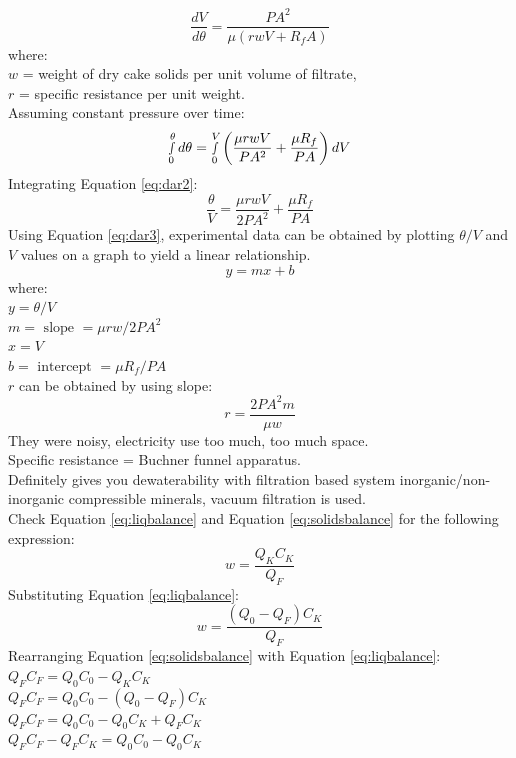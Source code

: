 \documentclass{article}
\numberwithin{equation}{section}
\begin{document}
\begin{enumerate} [start=5]
\begin{enumerate}
    \[
    \frac{dV}{d\theta} = \frac{PA^2}{\mu (rwV+R_fA)}
    \]
    where:\\
    $w$ = weight of dry cake solids per unit volume of filtrate,\\
    $r$ = specific resistance per unit weight.\\
    Assuming constant pressure over time:
    \begin{equation}
        \smallint_{0}^{\theta} d\theta = \smallint_{0}^{V} \left( \frac{\mu rwV}{PA^2}+\frac{\mu R_f}{PA}\right)dV \label{eq:dar2}
    \end{equation}
    Integrating Equation \ref{eq:dar2}:
    \begin{equation}
        \frac{\theta}{V} = \frac{\mu rwV}{2 P A^2} + \frac{\mu R_f}{P A} \label{eq:dar3}
    \end{equation}
    Using Equation \ref{eq:dar3}, experimental data can be obtained by plotting $\theta/V$ and $V$ values on a graph to yield a linear relationship.
    \[
    y=mx+b
    \]
    where:\\
    $y = \theta/V$\\
    $m = \text{ slope } = \mu rw / 2 PA^2$\\
    $x = V$\\
    $b = \text{ intercept } = \mu R_f / PA$\\
    $r$ can be obtained by using slope:
    \[
    r = \frac{2 P A^2 m}{\mu w}
    \]
    They were noisy, electricity use too much, too much space.\\
    Specific resistance = Buchner funnel apparatus.\\
    Definitely gives you dewaterability with filtration based system
    inorganic/non-inorganic compressible minerals, vacuum filtration is used.\\
    Check Equation \ref{eq:liqbalance} and Equation \ref{eq:solidsbalance} for the following expression:
    \begin{equation}
        w = \frac{Q_KC_K}{Q_F} \label{eq:w_1}
    \end{equation}
    Substituting Equation \ref{eq:liqbalance}:
    \[
    w = \frac{(Q_0-Q_F)C_K}{Q_F}
    \]
    Rearranging Equation \ref{eq:solidsbalance} with Equation \ref{eq:liqbalance}:\\
    \(Q_FC_F=Q_0C_0 - Q_KC_K\)\\
    \(Q_FC_F=Q_0C_0 - (Q_0-Q_F)C_K\)\\
    \(Q_FC_F=Q_0C_0 - Q_0C_K+Q_FC_K\)\\
    \(Q_FC_F -Q_FC_K = Q_0C_0 - Q_0C_K\)\\

\end{enumerate}
\end{enumerate}
\end{document}
